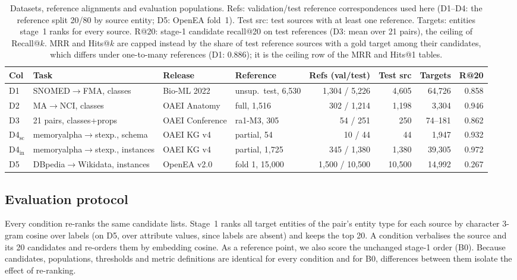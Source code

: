 \begin{table}[t]
\scriptsize
\setlength{\tabcolsep}{4pt}
\begin{threeparttable}
\caption{Datasets, reference alignments and evaluation populations. Refs:
validation/test reference correspondences used here (D1--D4: the reference
split 20/80 by source entity; D5: OpenEA fold~1). Test src: test sources
with at least one reference. Targets: entities stage~1 ranks for every
source. R@20: stage-1 candidate recall@20 on test references (D3: mean over
21 pairs), the ceiling of Recall@$k$. MRR and Hits@$k$ are capped instead by
the share of test reference sources with a gold target among their
candidates, which differs under one-to-many references (D1: 0.886); it is the
ceiling row of the MRR and Hits@1 tables.}
\label{tab:datasets}
\begin{tabular}{llllrrrr}
\hline
\textbf{Col} & \textbf{Task} & \textbf{Release} & \textbf{Reference} & \textbf{Refs (val/test)} & \textbf{Test src} & \textbf{Targets} & \textbf{R@20} \\
\hline
D1 & SNOMED$\to$FMA, classes & Bio-ML 2022 & unsup.\ test, 6,530 & 1,304 / 5,226 & 4,605 & 64,726 & 0.858 \\
D2 & MA$\to$NCI, classes & OAEI Anatomy & full, 1,516 & 302 / 1,214 & 1,198 & 3,304 & 0.946 \\
D3 & 21 pairs, classes+props & OAEI Conference & ra1-M3, 305 & 54 / 251 & 250 & 74--181 & 0.862 \\
D4$_{\mathrm{sc}}$ & memoryalpha$\to$stexp., schema & OAEI KG v4 & partial, 54 & 10 / 44 & 44 & 1,947 & 0.932 \\
D4$_{\mathrm{in}}$ & memoryalpha$\to$stexp., instances & OAEI KG v4 & partial, 1,725 & 345 / 1,380 & 1,380 & 39,305 & 0.972 \\
D5 & DBpedia$\to$Wikidata, instances & OpenEA v2.0 & fold 1, 15,000 & 1,500 / 10,500 & 10,500 & 14,992 & 0.267 \\
\hline
\end{tabular}
\end{threeparttable}
\end{table}

\subsection{Evaluation protocol}
\label{sec:protocol}

Every condition re-ranks the same candidate lists. Stage~1 ranks all target
entities of the pair's entity type for each source by character 3-gram cosine
over labels (on D5, over attribute values, since labels are absent) and keeps
the top 20. A condition verbalises the source and its 20 candidates and
re-orders them by embedding cosine. As a reference point, we also score the
unchanged stage-1 order (B0). Because candidates, populations, thresholds and
metric definitions are identical for every condition and for B0, differences
between them isolate the effect of re-ranking.

